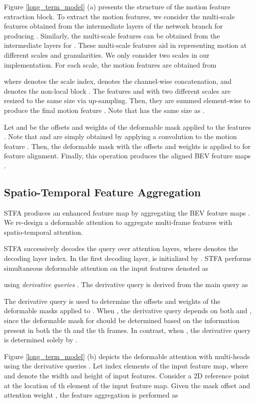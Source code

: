 \documentclass[letterpaper]{article} \usepackage{aaai23}  \usepackage{times}  \usepackage{helvet}  \usepackage{courier}  \usepackage[hyphens]{url}  \usepackage{graphicx} \urlstyle{rm} \def\UrlFont{\rm}  \usepackage{natbib}  \usepackage{caption} \frenchspacing  \setlength{\pdfpagewidth}{8.5in} \usepackage{algorithm}
\begin{document}
Figure \ref{long_term_model} (a) presents the structure of the motion feature extraction block.
To extract the motion features, we consider the multi-scale features  obtained from the intermediate  layers of the network branch for producing . Similarly, 
the multi-scale features  can be obtained from the intermediate layers for . These multi-scale features aid in representing motion at different scales and granularities. We only consider two scales  in our implementation. For each scale, the motion features are obtained from 

 where  denotes the scale index,  denotes the channel-wise concatenation, and   denotes the non-local block \cite{nonlocal}. The features  and  with two different scales are resized to the same size via up-sampling. Then, they are summed element-wise to produce the final motion feature . Note that   has the same size as .  
 
 
 Let   and   be the offsets and weights of the deformable mask applied to the features . Note that  and   are simply obtained by applying a  convolution to the motion feature . Then, the deformable mask with the offsets  and weights  is applied to  for feature alignment. Finally, this operation produces the aligned BEV feature maps .

\subsection{Spatio-Temporal Feature Aggregation}
STFA produces an enhanced feature map  by aggregating the BEV feature maps . We re-design a deformable attention \cite{def-detr} to aggregate multi-frame features with spatio-temporal attention. 

STFA successively decodes the query  over  attention layers, where  denotes the decoding layer index. In the first decoding layer,  is initialized by .
STFA performs simultaneous deformable attention on the  input features  denoted as

 using  {\it derivative queries} .   
The derivative query  is derived from the main query  as
 
The derivative query  is used to determine the offsets and weights of the deformable masks applied to . 
When , the derivative query  depends on both  and , since the deformable mask for  should be determined based on the information present in both the  th and the th frames. 
In contrast, when , the derivative query  is determined solely by .

Figure \ref{long_term_model} (b) depicts the deformable attention with  multi-heads using the derivative queries . 
Let  index  elements of the input feature map, where  and  denote the width and height of input features. Consider a 2D reference point  at the location of th element of the input feature map.
Given the mask offset  and attention weight , the feature aggregation is performed as
\end{document}
